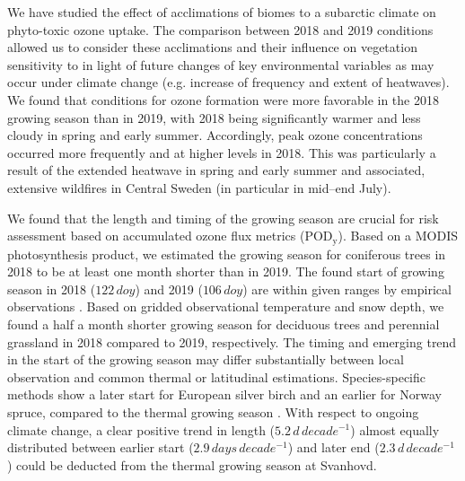 \documentclass[bg, manuscript]{copernicus}
\begin{document}
\label{sec:conc}

We have studied the effect of acclimations of biomes to a subarctic climate on phyto-toxic ozone uptake. The comparison between 2018 and 2019 conditions allowed us to consider these acclimations and their influence on vegetation sensitivity to  in light of future changes of key environmental variables as may occur under climate change (e.g. increase of frequency and extent of heatwaves). We found that conditions for ozone formation were more favorable in the 2018 growing season than in 2019, with 2018 being significantly warmer and less cloudy in spring and early summer. Accordingly, peak ozone concentrations occurred more frequently and at higher levels in 2018. This was particularly a result of the extended heatwave in spring and early summer and associated, extensive wildfires in Central Sweden (in particular in mid--end July).

We found that the length and timing of the growing season are crucial for risk assessment based on accumulated ozone flux metrics ($\mathrm{POD_y}$). Based on a MODIS photosynthesis product, we estimated the growing season for coniferous trees in 2018 to be at least one month shorter than in 2019. The found start of growing season in 2018 ($122\,\unit{doy}$) and 2019 ($106\,\unit{doy}$) are within given ranges by empirical observations \citep{TB:Kolari2007,IVL:Karlsson2018}. Based on gridded observational temperature and snow depth, we found a half a month shorter growing season for deciduous trees and perennial grassland in 2018 compared to 2019, respectively. The timing and emerging trend in the start of the growing season may differ substantially between local observation and common thermal or latitudinal estimations. Species-specific methods show a later start for European silver birch and an earlier for Norway spruce, compared to the thermal growing season \citep{IVL:Karlsson2018}. With respect to ongoing climate change, a clear positive trend in length ($5.2\,\unit{d\,decade^{-1}}$) almost equally distributed between earlier start ($2.9\,\unit{days\,decade^{-1}}$) and later end ($2.3\,\unit{d\,decade^{-1}}$) could be deducted from the thermal growing season at Svanhovd.
\end{document}
